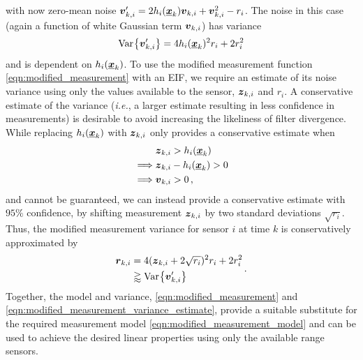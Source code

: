 \documentclass[10pt,letterpaper,oneside,twocolumn,journal]{IEEEtran}
\theoremstyle{definition}
\theoremstyle{definition}
\theoremstyle{remark}
\begin{document}
with now zero-mean noise ${\boldsymbol{v}}'_{k,i} = 2h_i({\boldsymbol{\underline{x}}}_k){\boldsymbol{v}}_{k,i} + {\boldsymbol{v}}_{k,i}^2 - r_i$. The noise in this case (again a function of white Gaussian term ${\boldsymbol{v}}_{k,i}$) has variance 
\begin{equation}
    \Var{\rv{v}'_{k,i}} = 4h_i(\rvec{x}_k)^2r_i + 2r_i^2
\end{equation}
and is dependent on $h_i({\boldsymbol{\underline{x}}}_k)$. To use the modified measurement function \eqref{eqn:modified_measurement} with an EIF, we require an estimate of its noise variance using only the values available to the sensor, ${\boldsymbol{z}}_{k,i}$ and $r_i$. A conservative estimate of the variance (\textit{i.e.}, a larger estimate resulting in less confidence in measurements) is desirable to avoid increasing the likeliness of filter divergence. While replacing $h_i({\boldsymbol{\underline{x}}}_k)$ with ${\boldsymbol{z}}_{k,i}$ only provides a conservative estimate when
\begin{equation}
    \begin{split}
        &{\boldsymbol{z}}_{k,i} > h_i({\boldsymbol{\underline{x}}}_k) \\
        \implies &{\boldsymbol{z}}_{k,i} - h_i({\boldsymbol{\underline{x}}}_k) > 0 \\
        \implies &{\boldsymbol{v}}_{k,i} > 0\,,
    \end{split}
\end{equation}
and cannot be guaranteed, we can instead provide a conservative estimate with $95\%$ confidence, by shifting measurement ${\boldsymbol{z}}_{k,i}$ by two standard deviations $\sqrt{r_i}$. Thus, the modified measurement variance for sensor $i$ at time $k$ is conservatively approximated by
\begin{equation}
    \begin{split}
        \rv{r}_{k, i} &= 4(\rv{z}_{k,i} + 2\sqrt{r_i})^2r_i + 2r_i^2 \\
        &\gtrapprox \Var{\rv{v}'_{k,i}}
    \end{split}\,. \label{eqn:modified_measurement_variance_estimate}
\end{equation}
Together, the model and variance, \eqref{eqn:modified_measurement} and \eqref{eqn:modified_measurement_variance_estimate}, provide a suitable substitute for the required measurement model \eqref{eqn:modified_measurement_model} and can be used to achieve the desired linear properties using only the available range sensors.

\end{document}
